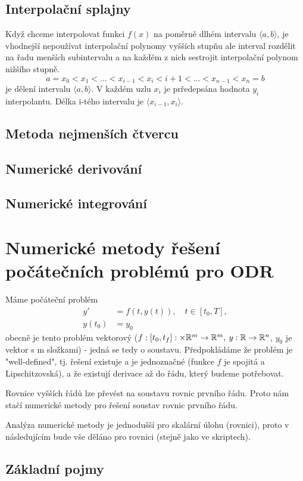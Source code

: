 \subsection{Interpolační splajny}
Když chceme interpolovat funkci $f(x)$ na poměrně dlhém intervalu $\langle a,b \rangle$, je vhodnejší nepoužívat interpolační polynomy vyšších stupňu ale interval rozdělit na řadu menších subintervalu a na každém z nich sestrojit interpolační polynom nižšího stupně. 
$$a=x_0 < x_1 < ... < x_{i-1} < x_{i} < {i+1} <...< x_{n-1} < x_n=b$$ je dělení intervalu $\langle a,b \rangle$. V každém uzlu $x_i$ je prředepsána hodnota $y_i$ interpolantu. Délka i-tého intervalu je $\langle x_{i-1},x_i \rangle$.
\subsection{Metoda nejmenších čtvercu}
\subsection{Numerické derivování}
\subsection{Numerické integrování}


\section{Numerické metody řešení počátečních problémú pro ODR}
Máme počáteční problém
\begin{align}
y'&=f(t,y(t)), \quad t \in [t_{0}, T], \\
y(t_{0})&=y_{0}
\end{align}
obecně je tento problém vektorový ($f:[t_{0},t_{f}]:\times\mathbb{R} ^{m} \rightarrow \mathbb{R}^{m}, \: y:\mathbb{R} \rightarrow \mathbb{R} ^{n}$, $y_{0}$ je vektor s m složkami) - jedná se tedy o soustavu.  Předpokládáme že problém je "well-defined", tj. řešení existuje a je jednoznačné (funkce $f$ je spojitá a  Lipschitzovská), a že existují derivace až do řádu, který budeme potřebovat. 

Rovnice vyšších řádů lze převést na soustavu rovnic prvního řádu. Proto nám stačí numerické metody pro řešení soustav rovnic prvního řádu.  

Analýza numerické metody je jednodušší pro skalární úlohu (rovnici), proto v následujícím bude vše děláno pro rovnici (stejně jako ve skriptech). 
\subsection{Základní pojmy}
